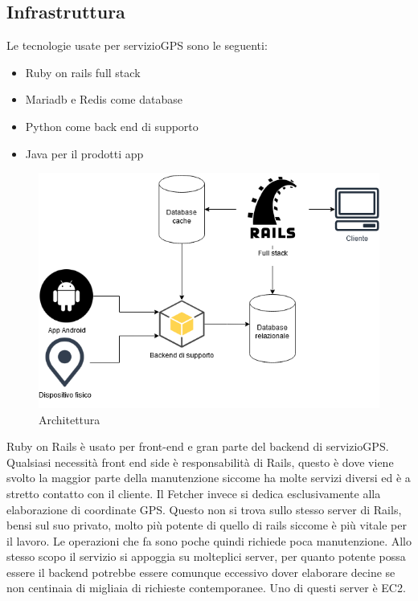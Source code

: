 \documentclass[12pt]{article}
\begin{document}
\subsection{Infrastruttura}
Le tecnologie usate per servizioGPS sono le seguenti:
\begin{itemize}
  \item Ruby on rails full stack
  \item Mariadb e Redis come database
  \item Python come back end di supporto
  \item Java per il prodotti app 
\end{itemize}
\begin{figure}[H]
\includegraphics[scale = 0.6]{infrastructure.png}
\caption{Architettura}
\label{fig:mesh1}
\end{figure}
Ruby on Rails è usato per front-end e gran parte del backend di servizioGPS. 
Qualsiasi necessità front end side è responsabilità di Rails, questo è dove 
viene svolto la maggior parte della manutenzione siccome ha molte servizi diversi 
ed è a stretto contatto con il cliente.
Il Fetcher invece si dedica esclusivamente alla elaborazione di coordinate GPS. 
Questo non si trova sullo stesso server di Rails, bensi sul suo privato, molto 
più potente di quello di rails siccome è più vitale per il lavoro.
Le operazioni che fa sono poche quindi richiede poca manutenzione. 
Allo stesso scopo il servizio si appoggia su molteplici server, per quanto 
potente possa essere il backend potrebbe essere comunque eccessivo dover 
elaborare decine se non centinaia di migliaia di richieste contemporanee.
Uno di questi server è EC2.
\end{document}
